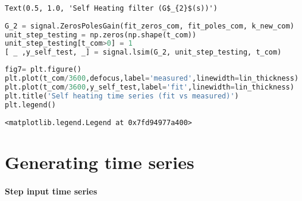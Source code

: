 \begin{spacing}{1} \begin{lstlisting}
Text(0.5, 1.0, 'Self Heating filter (G$_{2}$(s))')
\end{lstlisting} \end{spacing}


\begin{spacing}{1} \begin{lstlisting}[language=Python]
G_2 = signal.ZerosPolesGain(fit_zeros_com, fit_poles_com, k_new_com)
unit_step_testing = np.zeros(np.shape(t_com))
unit_step_testing[t_com>0] = 1
[ _ ,y_self_test, _] = signal.lsim(G_2, unit_step_testing, t_com)
\end{lstlisting} \end{spacing}

\begin{spacing}{1} \begin{lstlisting}[language=Python]
fig7= plt.figure()
plt.plot(t_com/3600,defocus,label='measured',linewidth=lin_thickness)
plt.plot(t_com/3600,y_self_test,label='fit',linewidth=lin_thickness)
plt.title('Self heating time series (fit vs measured)')
plt.legend()
\end{lstlisting} \end{spacing}

\begin{spacing}{1} \begin{lstlisting}
<matplotlib.legend.Legend at 0x7fd94977a400>
\end{lstlisting} \end{spacing}


\hypertarget{generating-time-series}{%
\section{Generating time series}\label{generating-time-series}}

\hypertarget{step-input-time-series}{%
\paragraph{Step input time series}\label{step-input-time-series}}

